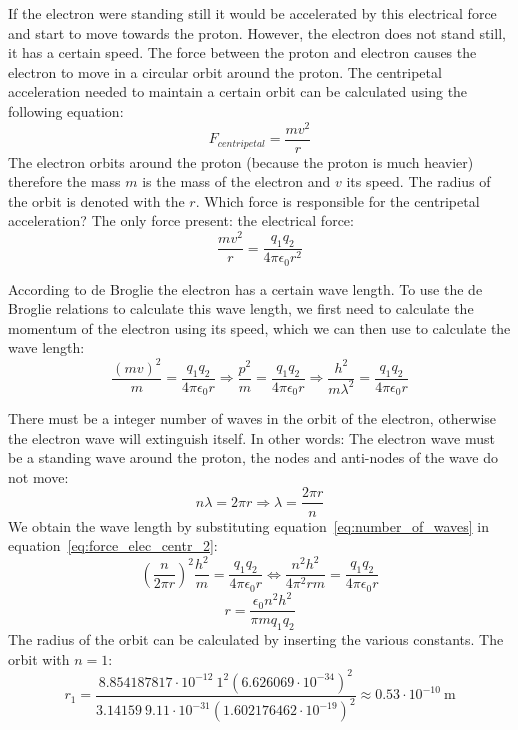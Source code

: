 \documentclass[12pt,a4paper]{article}
\numberwithin{equation}{section}
\numberwithin{figure}{section}
\numberwithin{table}{section}
\begin{document}
If the electron were standing still it would be accelerated by this electrical force and start to move towards the proton. However, the electron does not stand still, it has a certain speed. The force between the proton and electron causes the electron to move in a circular orbit around the proton. The centripetal acceleration needed to maintain a certain orbit can be calculated using the following equation:
\begin{equation}
F_{centripetal} = \frac{m v^2}{r} \label{eq:force_cent} 
\end{equation}
The electron orbits around the proton (because the proton is much heavier) therefore the mass $m$ is the mass of the electron and $v$ its speed. The radius of the orbit is denoted with the $r$. Which force is responsible for the centripetal acceleration? The only force present: the electrical force:
\begin{equation}
\frac{m v^2}{r} = \frac{q_1 q_2}{4 \pi \epsilon_0 r^2} \label{eq:force_elec_centr} 
\end{equation}

According to de Broglie the electron has a certain wave length. To use the de Broglie relations to calculate this wave length, we first need to calculate the momentum of the electron using its speed, which we can then use to calculate the wave length:
\begin{equation}
\frac{\left( {m v}\right) ^2}{m} = \frac{q_1 q_2}{4 \pi \epsilon_0 r} \Rightarrow \frac{p^2}{m}=\frac{q_1 q_2}{4 \pi \epsilon_0 r} \Rightarrow \frac{h^2}{m \lambda^2} = \frac{q_1 q_2}{4 \pi \epsilon_0 r} \label{eq:force_elec_centr_2} 
\end{equation}

There must be a integer number of waves in the orbit of the electron, otherwise the electron wave will extinguish itself. In other words: The electron wave must be a standing wave around the proton, the nodes and anti-nodes of the wave do not move:
\begin{equation}
n \lambda = 2 \pi r \Rightarrow \lambda = \frac{2 \pi r}{n} \label{eq:number_of_waves} 
\end{equation}
We obtain the wave length by substituting equation~\ref{eq:number_of_waves} in equation~\ref{eq:force_elec_centr_2}:
\begin{equation}
\left( \frac{n}{2 \pi r}\right)^2 \frac{h^2}{m} = \frac{q_1 q_2}{4 \pi \epsilon_0 r} \Leftrightarrow \frac{n^2 h^2}{4 \pi^2 r m} = \frac{q_1 q_2}{4 \pi \epsilon_0 r} \label{eq:number_of_waves_centr2} 
\end{equation}
\begin{equation}
r=\frac{\epsilon_0 n^2 h^2}{\pi m q_1 q_2} \label{eq:result_r} 
\end{equation}
The radius of the orbit can be calculated by inserting the various constants. The orbit with $n=1$:
\begin{equation}
r_1=\frac{8.854187817 \cdot 10^{-12} ~ 1^2 \left( 6.626069 \cdot 10^{-34} \right)^2 }{3.14159 ~ 9.11 \cdot 10^{-31} \left( 1.602176462 \cdot 10^{-19} \right)^2 } \approx 0.53 \cdot 10^{-10}~\mbox{m} \label{eq:result_r_1} 
\end{equation}
\end{document}
